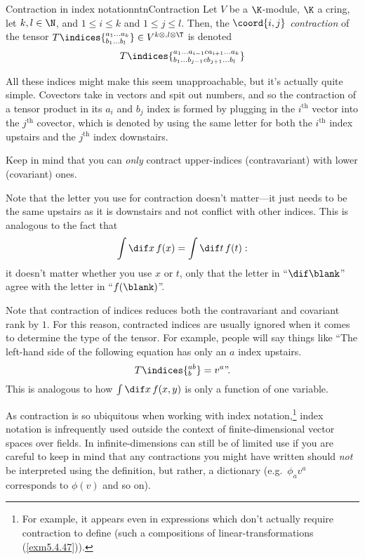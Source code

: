 \begin{ntn}{Contraction in index notation}{ntnContraction}
	Let $V$ be a $\K$-module, $\K$ a cring, let $k,l\in \N$, and $1\leq i\leq k$ and $1\leq j\leq l$.  Then, the $\coord{i,j}$ \emph{contraction} of the tensor $T\indices{^{a_1\ldots a_k}_{b_1\ldots b_l}}\in V^{k\otimes ,l\otimes \T}$ is denoted
	\begin{equation}
		T\indices{^{a_1\ldots a_{i-1}ca_{i+1}\ldots a_k}_{b_1\ldots b_{j-1}cb_{j+1}\ldots b_l}}
	\end{equation}
	\begin{rmk}
		All these indices might make this seem unapproachable, but it's actually quite simple.  Covectors take in vectors and spit out numbers, and so the contraction of a tensor product in its $a_i$ and $b_j$ index is formed by plugging in the $i^{\text{th}}$ vector into the $j^{\text{th}}$ covector, which is denoted by using the same letter for both the $i^{\text{th}}$ index upstairs and the $j^{\text{th}}$ index downstairs.
	\end{rmk}
	\begin{rmk}
		Keep in mind that you can \emph{only} contract upper-indices (contravariant) with lower (covariant) ones.
	\end{rmk}	
	\begin{rmk}
		Note that the letter you use for contraction doesn't matter---it just needs to be the same upstairs as it is downstairs and not conflict with other indices.  This is analogous to the fact that
		\begin{equation}
			\int \dif x\, f(x)=\int \dif t\, f(t):
		\end{equation}
		it doesn't matter whether you use $x$ or $t$, only that the letter in ``$\dif \blank$'' agree with the letter in ``$f(\blank )$''.
	\end{rmk}
	\begin{rmk}
		Note that contraction of indices reduces both the contravariant and covariant rank by $1$.  For this reason, contracted indices are usually ignored when it comes to determine the type of the tensor.  For example, people will say things like ``The left-hand side of the following equation has only an $a$ index upstairs.
		\begin{equation}
			T\indices{^{ab}_b}=v^a\text{''.}
		\end{equation}
		This is analogous to how $\int \dif x\, f(x,y)$ is only a function of one variable.
	\end{rmk}
	\begin{rmk}
		As contraction is so ubiquitous when working with index notation,\footnote{For example, it appears even in expressions which don't actually require contraction to define (such a compositions of linear-transformations (\cref{exm5.4.47})).} index notation is infrequently used outside the context of finite-dimensional vector spaces over fields.  In infinite-dimensions can still be of limited use if you are careful to keep in mind that any contractions you might have written should \emph{not} be interpreted using the definition, but rather, a dictionary (e.g.~$\phi _av^a$ corresponds to $\phi (v)$ and so on).
	\end{rmk}
\end{ntn}

